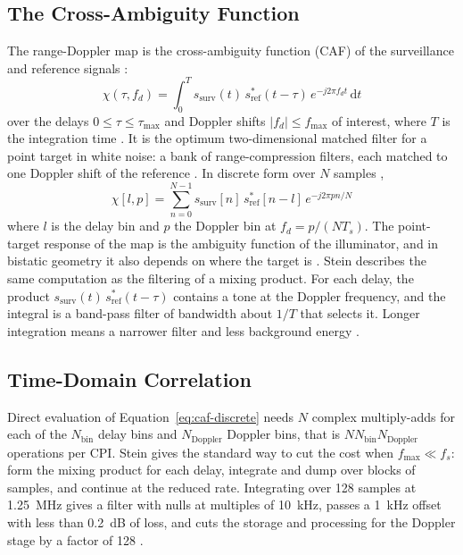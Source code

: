 \subsection{The Cross-Ambiguity Function}
\label{subsec:th.ard.caf}
\todo{}
The range-Doppler map is the cross-ambiguity function (CAF) of the surveillance and reference signals \citep{moscardini2015}:
\begin{equation}
    \chi(\tau, f_d) = \int_0^{T} s_{\mathrm{surv}}(t)\, s^*_{\mathrm{ref}}(t - \tau)\, e^{-j 2\pi f_d t}\, \mathrm{d}t
    \label{eq:caf}
\end{equation}
over the delays $0 \leq \tau \leq \tau_{\max}$ and Doppler shifts $|f_d| \leq f_{\max}$ of interest, where $T$ is the integration time \citep{moscardini2015}. It is the optimum two-dimensional matched filter for a point target in white noise: a bank of range-compression filters, each matched to one Doppler shift of the reference \citep{kuschel2019,moscardini2015}. In discrete form over $N$ samples \citep{colone2009},
\begin{equation}
    \chi[l, p] = \sum_{n=0}^{N-1} s_{\mathrm{surv}}[n]\, s^*_{\mathrm{ref}}[n - l]\, e^{-j 2\pi p n / N}
    \label{eq:caf-discrete}
\end{equation}
where $l$ is the delay bin and $p$ the Doppler bin at $f_d = p / (N T_s)$. The point-target response of the map is the ambiguity function of the illuminator, and in bistatic geometry it also depends on where the target is \citep{kuschel2019}. Stein \citep{stein1981} describes the same computation as the filtering of a mixing product. For each delay, the product $s_{\mathrm{surv}}(t)\, s^*_{\mathrm{ref}}(t - \tau)$ contains a tone at the Doppler frequency, and the integral is a band-pass filter of bandwidth about $1/T$ that selects it. Longer integration means a narrower filter and less background energy \citep{stein1981}.

\subsection{Time-Domain Correlation}
\label{subsec:th.ard.timedomain}
\todo{}
Direct evaluation of Equation~\ref{eq:caf-discrete} needs $N$ complex multiply-adds for each of the $N_{\mathrm{bin}}$ delay bins and $N_{\mathrm{Doppler}}$ Doppler bins, that is $N N_{\mathrm{bin}} N_{\mathrm{Doppler}}$ operations per CPI. Stein \citep{stein1981} gives the standard way to cut the cost when $f_{\max} \ll f_s$: form the mixing product for each delay, integrate and dump over blocks of samples, and continue at the reduced rate. Integrating over 128 samples at 1.25~MHz gives a filter with nulls at multiples of 10~kHz, passes a 1~kHz offset with less than 0.2~dB of loss, and cuts the storage and processing for the Doppler stage by a factor of 128 \citep{stein1981}.

